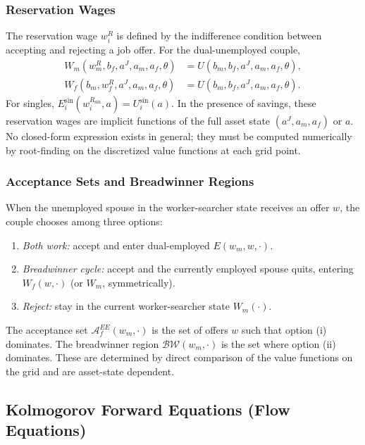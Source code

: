 \documentclass{article}
\begin{document}
\subsubsection*{Reservation Wages}
The reservation wage $w_i^R$ is defined by the indifference condition between accepting and rejecting a job offer. For the dual-unemployed couple,
\begin{align*}
    W_m(w_m^R, b_f, a^J, a_m, a_f, \theta) &= U(b_m, b_f, a^J, a_m, a_f, \theta), \\
    W_f(b_m, w_f^R, a^J, a_m, a_f, \theta) &= U(b_m, b_f, a^J, a_m, a_f, \theta).
\end{align*}
For singles, $E_i^{\sin}(w_i^{R_{\sin}}, a) = U_i^{\sin}(a)$. In the presence of savings, these reservation wages are implicit functions of the full asset state $(a^J, a_m, a_f)$ or $a$. No closed-form expression exists in general; they must be computed numerically by root-finding on the discretized value functions at each grid point.

\subsubsection*{Acceptance Sets and Breadwinner Regions}
When the unemployed spouse in the worker-searcher state receives an offer $w$, the couple chooses among three options:
\begin{enumerate}
    \item \textit{Both work:} accept and enter dual-employed $E(w_m, w, \cdot)$.
    \item \textit{Breadwinner cycle:} accept and the currently employed spouse quits, entering $W_f(w, \cdot)$ (or $W_m$, symmetrically).
    \item \textit{Reject:} stay in the current worker-searcher state $W_m(\cdot)$.
\end{enumerate}
The acceptance set $\mathcal{A}_f^{EE}(w_m, \cdot)$ is the set of offers $w$ such that option (i) dominates. The breadwinner region $\mathcal{BW}(w_m, \cdot)$ is the set where option (ii) dominates. These are determined by direct comparison of the value functions on the grid and are asset-state dependent.


\subsection{Kolmogorov Forward Equations (Flow Equations)}
\label{sec:kfe}
\end{document}
